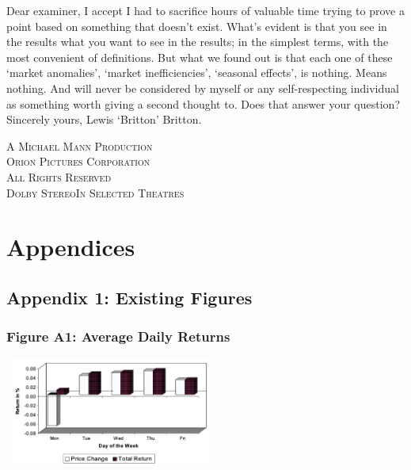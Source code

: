 \documentclass[11pt, english]{article}
\begin{document}
	Dear examiner, I accept I had to sacrifice hours of valuable time trying to prove a point based on something that doesn't exist. What's evident is that you see in the results what you want to see in the results; in the simplest terms, with the most convenient of definitions. But what we found out is that each one of these `market anomalies', `market inefficiencies', `seasonal effects', is nothing. Means nothing. And will never be considered by myself or any self-respecting individual as something worth giving a second thought to. Does that answer your question? Sincerely yours, Lewis `Britton' Britton.

	\vspace{\fill}

	\begin{center}
		\textsc{A Michael Mann Production}\\
		\textsc{ Orion Pictures Corporation}\\
		\textsc{\small{All Rights Reserved}}\\
		\textsc{Dolby Stereo\texttrademark In Selected Theatres}
	\end{center}

\newpage



	\section*{Appendices}

	\subsection*{Appendix 1: Existing Figures}

		\subsubsection*{Figure A1: Average Daily Returns}
			
			\begin{center}
				\includegraphics[width=7cm,height=3.5cm]{A1.png} 
			\end{center}
\end{document}
